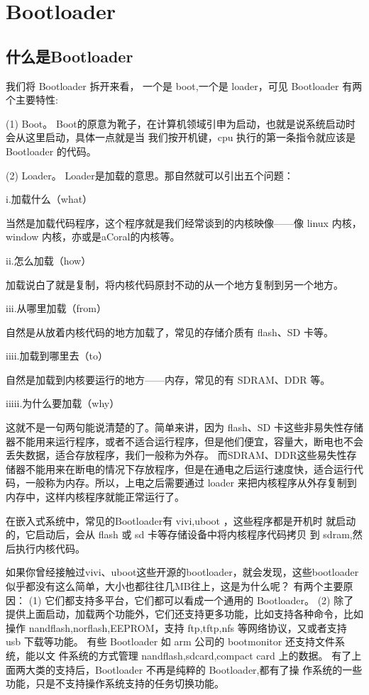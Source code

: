 \chapter{Bootloader}
\section{什么是Bootloader}
我们将 Bootloader 拆开来看，
一个是 boot,一个是 loader，可见 Bootloader 有两个主要特性:

(1) Boot。
Boot的原意为靴子，在计算机领域引申为启动，也就是说系统启动时会从这里启动，具体一点就是当
我们按开机键，cpu 执行的第一条指令就应该是 Bootloader 的代码。

(2) Loader。
Loader是加载的意思。那自然就可以引出五个问题：

i.加载什么（what）

当然是加载代码程序，这个程序就是我们经常谈到的内核映像——像 linux 内核，window 内核，亦或是aCoral的内核等。

ii.怎么加载（how）

加载说白了就是复制，将内核代码原封不动的从一个地方复制到另一个地方。

iii.从哪里加载（from）

自然是从放着内核代码的地方加载了，常见的存储介质有 flash、SD 卡等。

iiii.加载到哪里去（to）

自然是加载到内核要运行的地方——内存，常见的有 SDRAM、DDR 等。

iiiii.为什么要加载（why）

这就不是一句两句能说清楚的了。简单来讲，因为 flash、SD 卡这些非易失性存储器不能用来运行程序，或者不适合运行程序，但是他们便宜，容量大，断电也不会丢失数据，适合存放程序，我们一般称为外存。
而SDRAM、DDR这些易失性存储器不能用来在断电的情况下存放程序，但是在通电之后运行速度快，适合运行代码，一般称为内存。所以，上电之后需要通过 loader 来把内核程序从外存复制到内存中，这样内核程序就能正常运行了。


在嵌入式系统中，常见的Bootloader有 vivi,uboot ，这些程序都是开机时
就启动的，它启动后，会从 flash 或 sd 卡等存储设备中将内核程序代码拷贝
到 sdram,然后执行内核代码。

如果你曾经接触过vivi、uboot这些开源的bootloader，就会发现，这些bootloader似乎都没有这么简单，大小也都往往几MB往上，这是为什么呢？
有两个主要原因：
(1) 它们都支持多平台，它们都可以看成一个通用的 Bootloader。
(2) 除了提供上面启动，加载两个功能外，它们还支持更多功能，比如支持各种命令，比如操作 nandflash,norflash,EEPROM，支持 ftp,tftp,nfs 等网络协议，又或者支持 usb 下载等功能。
有些 Bootloader 如 arm 公司的 bootmonitor 还支持文件系统，能以文
件系统的方式管理 nandflash,sdcard,compact card 上的数据。
有了上面两大类的支持后，Bootloader 不再是纯粹的 Bootloader,都有了操
作系统的一些功能，只是不支持操作系统支持的任务切换功能。

